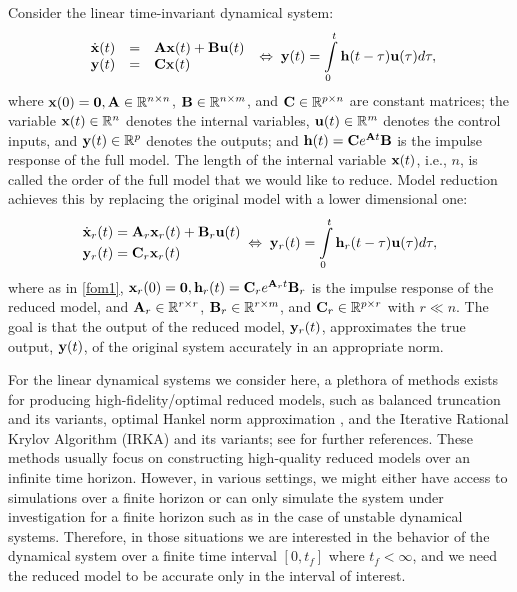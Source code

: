 \documentclass[twocolumn]{autart}
\begin{document}
Consider the linear time-invariant dynamical system:
\begin{equation}  \label{fom1}
\begin{array}{rcl}
\dot{\x}(t) & =& \A\x(t) +\B\uu(t)\\
\y(t)&=&\C\x(t) 
\end{array}
\; \Leftrightarrow \;
\y(t)=\int_{0}^{t}\h (t-\tau)\uu(\tau) d\tau,
\end{equation}
\noindent
where $  \mathbf{x}(0) = \mathbf{0}, \mathbf{A} \in \mathbb{R}^{n\times n}$, $\mathbf{B}\in \mathbb{R}^{n\times m}$, and $\mathbf{C}\in \mathbb{R}^{p\times n}$ are constant matrices; 
the variable $\mathbf{x}(t)\in \mathbb{R}^n$ denotes the internal variables, $\mathbf{u}(t)\in \mathbb{R}^m$ denotes the control inputs, and $\mathbf{y}(t)\in \mathbb{R}^p$ denotes the outputs; and $\mathbf{h}(t)=\mathbf{C} e^{\mathbf{A} t}\mathbf{B}$ is the impulse response of the full model.   The length of the internal variable $\mathbf{x}(t)$, i.e., $n$, is called the order of the full model that we would like to reduce.  Model
reduction achieves this by replacing the original model with a lower dimensional one:
\begin{equation}  \label{rom1}
\begin{aligned}
\dot{\x}_r(t)&=\A_r\x_r(t)+\B_r\uu(t)\\
\y_r(t)&=\C_r\x_r(t) 
\end{aligned}
\; \Leftrightarrow \;
\y_r(t)=\int_{0}^{t}\h_r (t-\tau)\uu(\tau)d\tau,
\end{equation}
where as in \eqref{fom1}, $\mathbf{x}_r(0) = \mathbf{0}, \mathbf{h}_r(t)=\mathbf{C}_r e^{\mathbf{A}_r t}\mathbf{B}_r$ is the impulse response of the reduced model, and $\mathbf{A}_r \in \mathbb{R}^{r\times r}$, $\mathbf{B}_r\in \mathbb{R}^{r\times m}$, and $\mathbf{C}_r\in \mathbb{R}^{p\times r}$ with $r\ll n$. The goal is that the output of the reduced model, $\mathbf{y}_r(t)$, approximates the true output, $\mathbf{y}(t)$, of the original system accurately in an appropriate norm. 

For the linear dynamical systems we consider here, a plethora of methods exists
for producing high-fidelity/optimal reduced models, such as  balanced truncation \cite{MulR76,Moo81} and its variants, optimal Hankel norm approximation \cite{Glo84}, and the Iterative Rational Krylov Algorithm (IRKA) \cite{GugBA08} and its variants; see \cite{Ant05,BauBF14} for further references.
These methods usually focus on constructing high-quality reduced models  over an infinite time horizon. However, in various settings, we might either have access to simulations over a finite horizon or can only simulate the system under investigation for a finite horizon such as in the case of unstable dynamical systems. Therefore, in those situations we are interested in the behavior of the dynamical system over a finite time interval $[0,t_f]$ where $t_f < \infty$, and we need the reduced model to be accurate only in the interval of interest. 
\end{document}
